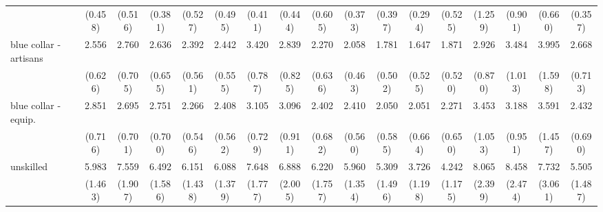 {\begin{tabular}{l*{16}{c}}
                    &     (0.458)         &     (0.516)         &     (0.381)         &     (0.527)         &     (0.495)         &     (0.411)         &     (0.444)         &     (0.605)         &     (0.373)         &     (0.397)         &     (0.294)         &     (0.525)         &     (1.259)         &     (0.901)         &     (0.660)         &     (0.357)         \\
[1em]
blue collar - artisans&       2.556\sym{***}&       2.760\sym{***}&       2.636\sym{***}&       2.392\sym{***}&       2.442\sym{***}&       3.420\sym{***}&       2.839\sym{***}&       2.270\sym{**} &       2.058\sym{**} &       1.781\sym{*}  &       1.647         &       1.871\sym{*}  &       2.926\sym{***}&       3.484\sym{***}&       3.995\sym{***}&       2.668\sym{***}\\
                    &     (0.626)         &     (0.705)         &     (0.655)         &     (0.561)         &     (0.555)         &     (0.787)         &     (0.825)         &     (0.636)         &     (0.463)         &     (0.502)         &     (0.525)         &     (0.520)         &     (0.870)         &     (1.013)         &     (1.598)         &     (0.713)         \\
[1em]
blue collar - equip.&       2.851\sym{***}&       2.695\sym{***}&       2.751\sym{***}&       2.266\sym{***}&       2.408\sym{***}&       3.105\sym{***}&       3.096\sym{***}&       2.402\sym{**} &       2.410\sym{***}&       2.050\sym{*}  &       2.051\sym{*}  &       2.271\sym{**} &       3.453\sym{***}&       3.188\sym{***}&       3.591\sym{**} &       2.432\sym{**} \\
                    &     (0.716)         &     (0.701)         &     (0.700)         &     (0.546)         &     (0.562)         &     (0.729)         &     (0.911)         &     (0.682)         &     (0.560)         &     (0.585)         &     (0.664)         &     (0.650)         &     (1.053)         &     (0.951)         &     (1.457)         &     (0.690)         \\
[1em]
unskilled           &       5.983\sym{***}&       7.559\sym{***}&       6.492\sym{***}&       6.151\sym{***}&       6.088\sym{***}&       7.648\sym{***}&       6.888\sym{***}&       6.220\sym{***}&       5.960\sym{***}&       5.309\sym{***}&       3.726\sym{***}&       4.242\sym{***}&       8.065\sym{***}&       8.458\sym{***}&       7.732\sym{***}&       5.505\sym{***}\\
                    &     (1.463)         &     (1.907)         &     (1.586)         &     (1.438)         &     (1.379)         &     (1.777)         &     (2.005)         &     (1.757)         &     (1.354)         &     (1.496)         &     (1.198)         &     (1.175)         &     (2.399)         &     (2.474)         &     (3.061)         &     (1.487)         \\

\end{tabular}}
